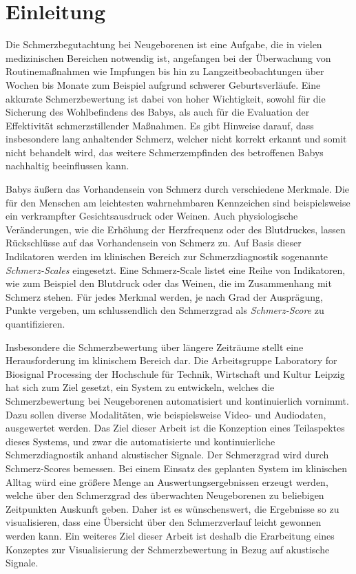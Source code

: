 \chapter{Einleitung}

Die Schmerzbegutachtung bei Neugeborenen ist eine Aufgabe, die in vielen medizinischen Bereichen notwendig ist, angefangen bei der Überwachung von Routinemaßnahmen wie Impfungen bis hin zu Langzeitbeobachtungen über Wochen bis Monate zum Beispiel aufgrund schwerer Geburtsverläufe. Eine akkurate Schmerzbewertung ist dabei von hoher Wichtigkeit, sowohl für die Sicherung des Wohlbefindens des Babys, als auch für die Evaluation der Effektivität schmerzstillender Maßnahmen. Es gibt Hinweise darauf, dass insbesondere lang anhaltender Schmerz, welcher nicht korrekt erkannt und somit nicht behandelt wird, das weitere Schmerzempfinden des betroffenen Babys nachhaltig beeinflussen kann.\cite[S. 402 - 403]{PainAssessment03} \cite[S. 439]{PainAssessment01}

Babys äußern das Vorhandensein von Schmerz durch verschiedene Merkmale. Die für den Menschen am leichtesten wahrnehmbaren Kennzeichen sind beispielsweise ein verkrampfter Gesichtsausdruck oder Weinen. Auch physiologische Veränderungen, wie die Erhöhung der Herzfrequenz oder des Blutdruckes, lassen Rückschlüsse auf das Vorhandensein von Schmerz zu.\cite[S. 440]{PainAssessment01} Auf Basis dieser Indikatoren werden im klinischen Bereich zur Schmerzdiagnostik sogenannte \emph{Schmerz-Scales} eingesetzt. Eine Schmerz-Scale listet eine Reihe von Indikatoren, wie zum Beispiel den Blutdruck oder das Weinen, die im Zusammenhang mit Schmerz stehen. Für jedes Merkmal werden, je nach Grad der Ausprägung, Punkte vergeben, um schlussendlich den Schmerzgrad als \emph{Schmerz-Score} zu quantifizieren.\cite[S. 406]{PainAssessment03}

Insbesondere die Schmerzbewertung über längere Zeiträume stellt eine Herausforderung im klinischem Bereich dar. Die Arbeitsgruppe \glqq Laboratory for Biosignal Processing\grqq{} der Hochschule für Technik, Wirtschaft und Kultur Leipzig hat sich zum Ziel gesetzt, ein System zu entwickeln, welches die Schmerzbewertung bei Neugeborenen automatisiert und kontinuierlich vornimmt. Dazu sollen diverse Modalitäten, wie beispielsweise Video- und Audiodaten, ausgewertet werden. Das Ziel dieser Arbeit ist die Konzeption eines Teilaspektes dieses Systems, und zwar die automatisierte und kontinuierliche Schmerzdiagnostik anhand akustischer Signale. Der Schmerzgrad wird durch Schmerz-Scores bemessen. Bei einem Einsatz des geplanten System im klinischen Alltag würd eine größere Menge an Auswertungsergebnissen erzeugt werden, welche über den Schmerzgrad des überwachten Neugeborenen zu beliebigen Zeitpunkten Auskunft geben. Daher ist es wünschenswert, die Ergebnisse so zu visualisieren, dass eine Übersicht über den Schmerzverlauf leicht gewonnen werden kann. Ein weiteres Ziel dieser Arbeit ist deshalb die Erarbeitung eines Konzeptes zur Visualisierung der Schmerzbewertung in Bezug auf akustische Signale.

